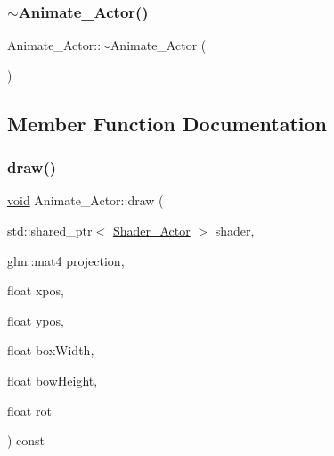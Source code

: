 \mbox{\label{classAnimate__Actor_a7915c06d4d0a12655b1f3290398c109a}} 
\subsubsection{\texorpdfstring{$\sim$\+Animate\+\_\+\+Actor()}{~Animate\_Actor()}}
{\footnotesize\ttfamily Animate\+\_\+\+Actor\+::$\sim$\+Animate\+\_\+\+Actor (\begin{DoxyParamCaption}{ }\end{DoxyParamCaption})}



\subsection{Member Function Documentation}
\mbox{\label{classAnimate__Actor_aff9d0d27d13899605b35524ac52b8324}} 
\subsubsection{\texorpdfstring{draw()}{draw()}\hspace{0.1cm}{\footnotesize\ttfamily [1/2]}}
{\footnotesize\ttfamily \hyperlink{imgui__impl__opengl3__loader_8h_ac668e7cffd9e2e9cfee428b9b2f34fa7}{void} Animate\+\_\+\+Actor\+::draw (\begin{DoxyParamCaption}\item[{std\+::shared\+\_\+ptr$<$ \hyperlink{classShader__Actor}{Shader\+\_\+\+Actor} $>$}]{shader,  }\item[{glm\+::mat4}]{projection,  }\item[{float}]{xpos,  }\item[{float}]{ypos,  }\item[{float}]{box\+Width,  }\item[{float}]{bow\+Height,  }\item[{float}]{rot }\end{DoxyParamCaption}) const}

\mbox{\label{classAnimate__Actor_af54ad48de36fd39ac7b9000c1f76d2ba}} 
